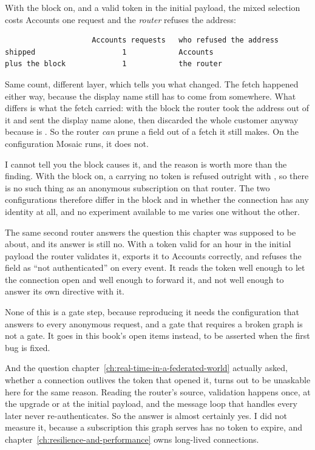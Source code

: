 With the block on, and a valid token in the initial payload, the mixed selection
costs Accounts one request and the \emph{router} refuses the address:

\begin{verbatim}
                    Accounts requests   who refused the address
shipped                    1            Accounts
plus the block             1            the router
\end{verbatim}

Same count, different layer, which tells you what changed. The fetch happened
either way, because the display name still has to come from somewhere. What
differs is what the fetch carried: with the block the router took the address
out of it and sent the display name alone, then discarded the whole customer
anyway because  is . So the router \emph{can} prune a
field out of a fetch it still makes. On the configuration Mosaic runs, it does
not.

I cannot tell you the block causes it, and the reason is worth more than the
finding. With the block on, a  carrying no token is
refused outright with , so there is
no such thing as an anonymous subscription on that router. The two
configurations therefore differ in the block and in whether the connection has
any identity at all, and no experiment available to me varies one without the
other.

%
The same second router answers the question this chapter was supposed to be
about, and its answer is still no. With a token valid for an hour in the initial
payload the router validates it, exports it to Accounts correctly, and refuses
the  field as \enquote{not authenticated} on every event.
It reads the token well enough to let the connection open and well enough to
forward it, and not well enough to answer its own directive with it.

None of this is a gate step, because reproducing it needs the configuration that
answers  to every anonymous request, and a gate that requires a broken
graph is not a gate. It goes in this book's open items instead, to be asserted
when the first bug is fixed.

%
And the question chapter~\ref{ch:real-time-in-a-federated-world} actually asked,
whether a connection outlives the token that opened it, turns out to be
unaskable here for the same reason. Reading the router's source, validation
happens once, at the upgrade or at the initial payload, and the message loop
that handles every later  never re-authenticates. So the answer
is almost certainly yes. I did not measure it, because a subscription this graph
serves has no token to expire, and chapter~\ref{ch:resilience-and-performance}
owns long-lived connections.

